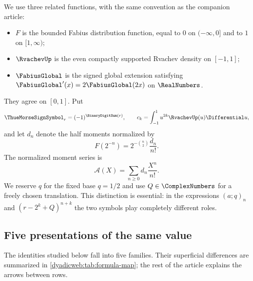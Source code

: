 \documentclass[11pt,oneside]{article}
\theoremstyle{definition}
\theoremstyle{remark}
\begin{document}
We use three related functions, with the same convention as the companion article:
\begin{itemize}
\item $F$ is the bounded Fabius distribution function, equal to $0$ on $(-\infty,0]$ and to
      $1$ on $[1,\infty)$;
\item $\RvachevUp$ is the even compactly supported Rvachev density on $[-1,1]$;
\item $\FabiusGlobal$ is the signed global extension satisfying
      $\FabiusGlobal'(x)=2\FabiusGlobal(2x)$ on $\RealNumbers$.
\end{itemize}
They agree on $[0,1]$.  Put
\[
 \ThueMorseSignSymbol_r=(-1)^{\BinaryDigitSum(r)},\qquad
 c_k=\int_{-1}^{1}u^{2k}\RvachevUp(u)\Differential u,
\]
and let $d_n$ denote the half moments normalized by
\begin{equation}
 F(2^{-n})=2^{-\binom n2}\frac{d_n}{n!}.                 \label{dyadicweb:eq:inverse-dyadic-input}
\end{equation}
The normalized moment series is
\begin{equation}
 \mathscr A(X)=\sum_{n\ge0}d_n\frac{X^n}{n!}.             \label{dyadicweb:eq:A-def}
\end{equation}
We reserve $q$ for the fixed base $q=1/2$ and use $Q\in\ComplexNumbers$ for a freely chosen translation.
This distinction is essential: in the expressions $(a;q)_n$ and
$(r-2^k+Q)^{n+k}$ the two symbols play completely different roles.

\subsection{Five presentations of the same value}

The identities studied below fall into five families.  Their superficial differences are
summarized in \cref{dyadicweb:tab:formula-map}; the rest of the article explains the arrows between
rows.
\end{document}
